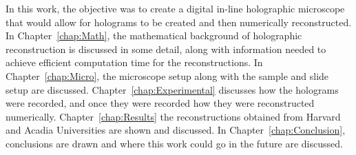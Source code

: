 In this work, the objective was to create a digital in-line holographic
microscope that would allow for holograms to be created and then numerically
reconstructed. In Chapter~\ref{chap:Math}, the mathematical background of
holographic reconstruction is discussed in some detail, along with information
needed to achieve efficient computation time for the reconstructions. In
Chapter~\ref{chap:Micro}, the microscope setup along with the sample and slide
setup are discussed. Chapter~\ref{chap:Experimental} discusses how the
holograms were recorded, and once they were recorded how they were
reconstructed numerically. Chapter~\ref{chap:Results} the reconstructions
obtained from Harvard and Acadia Universities are shown and discussed. In
Chapter~\ref{chap:Conclusion}, conclusions are drawn and where this work could
go in the future are discussed.



